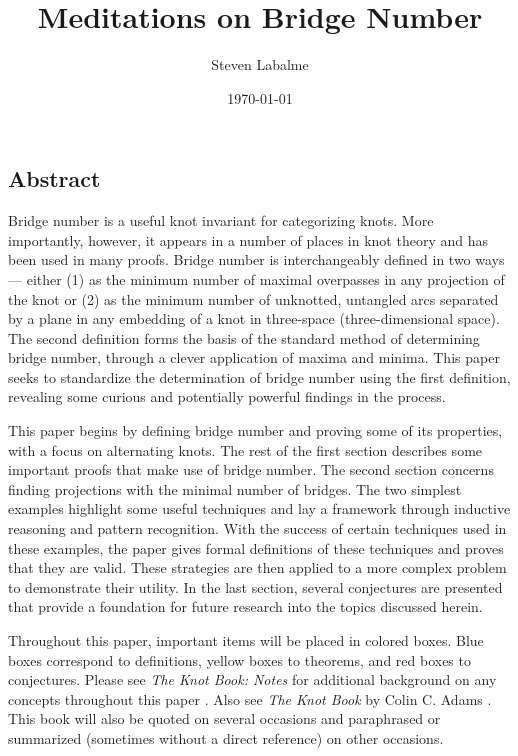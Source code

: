 \documentclass[titlepage]{article}
\title{Meditations on Bridge Number}
\author{Steven Labalme}
\date{\today}
\begin{document}
\maketitle



\tableofcontents
\listoffigures
\listoftables
\newpage



\pagestyle{fancy}
\fancyhf{}
\renewcommand{\headrulewidth}{0pt}
\begin{center}
    \setcounter{secnumdepth}{0}
    \section{Abstract}
    \setcounter{secnumdepth}{3}
\end{center}
Bridge number is a useful knot invariant for categorizing knots. More importantly, however, it appears in a number of places in knot theory and has been used in many proofs. Bridge number is interchangeably defined in two ways --- either (1) as the minimum number of maximal overpasses in any projection of the knot or (2) as the minimum number of unknotted, untangled arcs separated by a plane in any embedding of a knot in three-space (three-dimensional space). The second definition forms the basis of the standard method of determining bridge number, through a clever application of maxima and minima. This paper seeks to standardize the determination of bridge number using the first definition, revealing some curious and potentially powerful findings in the process.\par
This paper begins by defining bridge number and proving some of its properties, with a focus on alternating knots. The rest of the first section describes some important proofs that make use of bridge number. The second section concerns finding projections with the minimal number of bridges. The two simplest examples highlight some useful techniques and lay a framework through inductive reasoning and pattern recognition. With the success of certain techniques used in these examples, the paper gives formal definitions of these techniques and proves that they are valid. These strategies are then applied to a more complex problem to demonstrate their utility. In the last section, several conjectures are presented that provide a foundation for future research into the topics discussed herein.\par
Throughout this paper, important items will be placed in colored boxes. Blue boxes correspond to definitions, yellow boxes to theorems, and red boxes to conjectures. Please see \emph{The Knot Book: Notes} for additional background on any concepts throughout this paper \cite{bib:knotnotes}. Also see \emph{The Knot Book} by Colin C. Adams \cite{bib:knotbook}. This book will also be quoted on several occasions and paraphrased or summarized (sometimes without a direct reference) on other occasions.
\newpage
\end{document}
